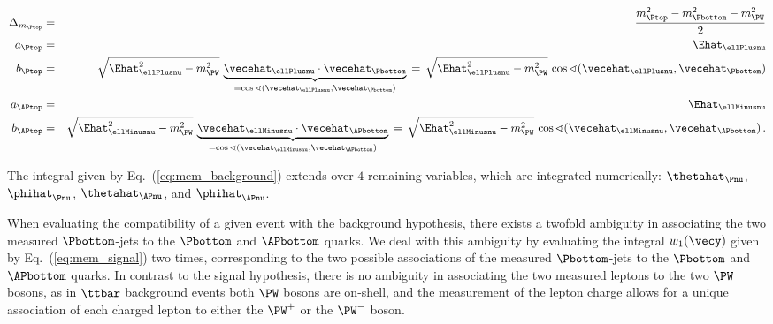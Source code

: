 \begin{linenowrapper}
\begin{eqnarray}
\Delta_{m_{\Ptop}} & = & \frac{m_{\Ptop}^{2} - m_{\Pbottom}^{2} - m_{\PW}^{2}}{2} \nonumber \\
a_{\Ptop} & = & \Ehat_{\ellPlusnu} \nonumber \\
b_{\Ptop} & = & \sqrt{\Ehat_{\ellPlusnu}^{2} - m_{\PW}^{2}} \, 
 \underbrace{\vecehat_{\ellPlusnu} \cdot \vecehat_{\Pbottom}}_{= \cos\sphericalangle(\vecehat_{\ellPlusnu},\vecehat_{\Pbottom})} \, 
= \, \sqrt{\Ehat_{\ellPlusnu}^{2} - m_{\PW}^{2}} \, \cos\sphericalangle(\vecehat_{\ellPlusnu},\vecehat_{\Pbottom}) \nonumber \\
a_{\APtop} & = & \Ehat_{\ellMinusnu} \nonumber \\
b_{\APtop} & = & \sqrt{\Ehat_{\ellMinusnu}^{2} - m_{\PW}^{2}} \, 
 \underbrace{\vecehat_{\ellMinusnu} \cdot \vecehat_{\APbottom}}_{= \cos\sphericalangle(\vecehat_{\ellMinusnu},\vecehat_{\APbottom})} \,
= \, \sqrt{\Ehat_{\ellMinusnu}^{2} - m_{\PW}^{2}} \, \cos\sphericalangle(\vecehat_{\ellMinusnu},\vecehat_{\APbottom}) \, .
\end{eqnarray}
\end{linenowrapper}
The integral given by Eq.~(\ref{eq:mem_background}) extends over $4$ remaining variables,
which are integrated numerically: $\thetahat_{\Pnu}$, $\phihat_{\Pnu}$, $\thetahat_{\APnu}$, and $\phihat_{\APnu}$.

When evaluating the compatibility of a given event with the background hypothesis,
there exists a twofold ambiguity in associating the two measured $\Pbottom$-jets to the $\Pbottom$ and $\APbottom$ quarks.
We deal with this ambiguity by evaluating the integral $w_{1}(\vecy)$ given by Eq.~(\ref{eq:mem_signal}) two times,
corresponding to the two possible associations of the measured $\Pbottom$-jets to the $\Pbottom$ and $\APbottom$ quarks.
In contrast to the signal hypothesis,
there is no ambiguity in associating the two measured leptons to the two $\PW$ bosons,
as in $\ttbar$ background events both $\PW$ bosons are on-shell,
and the measurement of the lepton charge allows for a unique association of each charged lepton to either the $\PW^{+}$ or the $\PW^{-}$ boson.

